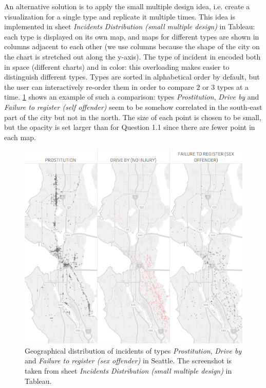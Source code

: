An alternative solution is to apply the small multiple design idea, i.e. create a visualization for a single type and replicate it multiple times.
This idea is implemented in sheet \textit{Incidents Distribution (small multiple design)} in Tableau:
each type is displayed on its own map, and maps for different types are shown in columns adjacent to each other (we use columns because the shape of the city on the chart is stretched out along the y-axis).
The type of incident in encoded both in space (different charts) and in color:
this overloading makes easier to distinguish different types.
Types are sorted in alphabetical order by default, but the user can interactively re-order them in order to compare $2$ or $3$ types at a time.
\cref{fig:1_2_geographical_distribution_comparison} shows an example of such a comparison:
types \textit{Prostitution}, \textit{Drive by} and \textit{Failure to register (self offender)} seem to be somehow correlated in the south-east part of the city but not in the north.
The size of each point is chosen to be small, but the opacity is set larger than for Question 1.1 since there are fewer point in each map.

\begin{figure}[h]
	\centering
	\includegraphics[width=.75\columnwidth]{figures/1_2_geographical_distribution_comparison}
	\caption{Geographical distribution of incidents of types \textit{Prostitution}, \textit{Drive by} and \textit{Failure to register (sex offender)} in Seattle. The screenshot is taken from sheet \textit{Incidents Distribution (small multiple design)} in Tableau.}
	\label{fig:1_2_geographical_distribution_comparison}
\end{figure}
